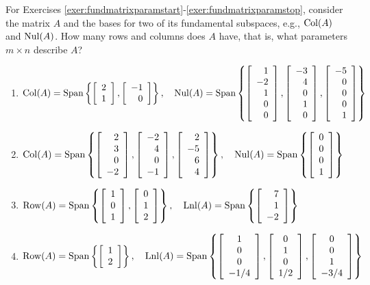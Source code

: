 \noindent For Exercises \ref{exer:fundmatrixparamstart}-\ref{exer:fundmatrixparamstop}, consider the matrix $A$ and the bases for two of its fundamental subspaces, e.g., $\col(A)$ and $\nul(A)$. How many rows and columns does $A$ have, that is, what parameters $m\times n$ describe $A$? 
\begin{enumerate}[!HW!, start=1]
\item\label{exer:fundmatrixparamstart} $\col(A) = \Span\left\{\vr{2\\1}, \vr{-1\\0}\right\},\quad \nul(A)=\Span\left\{\vr{1\\-2\\1\\0\\0}, \vr{-3\\4\\0\\1\\0}, \vr{-5\\0\\0\\0\\1}\right\}$ %
\item $\col(A) = \Span\left\{\vr{2\\3\\0\\-2}, \vr{-2\\4\\0\\-1}, \vr{2\\-5\\6\\4}\right\},\quad \nul(A)=\Span\left\{\vr{0\\0\\0\\1}\right\}$ %
\item $\row(A) = \Span\left\{\vr{1\\0\\1}, \vr{0\\1\\2}\right\},\quad \lnl(A)=\Span\left\{\vr{7\\1\\-2}\right\}$  %
\item\label{exer:fundmatrixparamstop} $\row(A) = \Span\left\{\vr{1\\2}\right\},\quad \lnl(A)=\Span\left\{\mtx{c}{1\\0\\0\\-1/4}, \mtx{c}{0\\1\\0\\1/2}, \mtx{c}{0\\0\\1\\-3/4}\right\}$ %
\end{enumerate}

